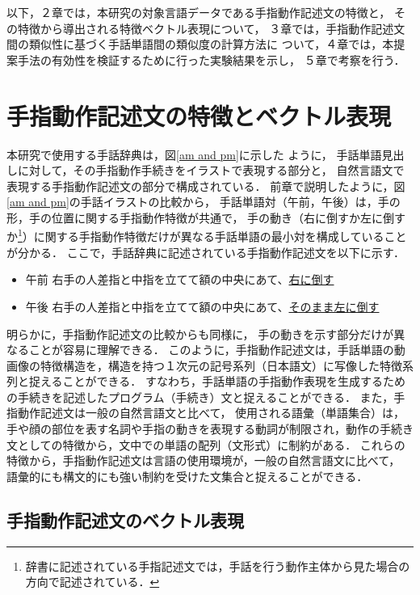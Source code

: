 以下，２章では，本研究の対象言語データである手指動作記述文の特徴と，
その特徴から導出される特徴ベクトル表現について，
３章では，手指動作記述文間の類似性に基づく手話単語間の類似度の計算方法に
ついて，４章では，本提案手法の有効性を検証するために行った実験結果を示し，
５章で考察を行う．

\section {手指動作記述文の特徴とベクトル表現}

本研究で使用する手話辞典\cite{MaruyamaKoji1984}は，図\ref{am and pm}に示した
ように，
手話単語見出しに対して，その手指動作手続きをイラストで表現する部分と，
自然言語文で表現する手指動作記述文の部分で構成されている．
前章で説明したように，図\ref{am and pm}の手話イラストの比較から，
手話単語対（午前，午後）は，手の形，手の位置に関する手指動作特徴が共通で，
手の動き（右に倒すか左に倒すか\footnote{辞書に記述されている手指記述文では，手話を行う動作主体から見た場合の方向で記述されている．}）に関する手指動作特徴だけが異なる手話単語の最小対を構成していることが分かる．
ここで，手話辞典に記述されている手指動作記述文を以下に示す．

\begin{itemize}
\item {\gt 午前} 右手の人差指と中指を立てて額の中央にあて、\underline{右に倒す}
\item {\gt 午後} 右手の人差指と中指を立てて額の中央にあて、\underline{そのまま左に倒す}
\end{itemize}

明らかに，手指動作記述文の比較からも同様に，
手の動きを示す部分だけが異なることが容易に理解できる．
このように，手指動作記述文は，手話単語の動画像の特徴構造を，構造を持つ１次元の記号系列（日本語文）に写像した特徴系列と捉えることができる．
すなわち，手話単語の手指動作表現を生成するための手続きを記述したプログラム（手続き）文と捉えることができる．
また，手指動作記述文は一般の自然言語文と比べて，
使用される語彙（単語集合）は，
手や顔の部位を表す名詞や手指の動きを表現する動詞が制限され，動作の手続き文としての特徴から，文中での単語の配列（文形式）に制約がある．
これらの特徴から，手指動作記述文は言語の使用環境が，一般の自然言語文に比べて，
語彙的にも構文的にも強い制約を受けた文集合と捉えることができる．

\subsection {手指動作記述文のベクトル表現}

